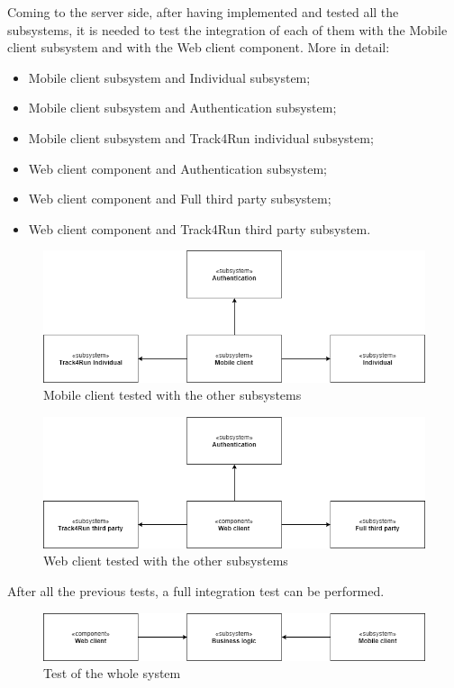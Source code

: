 Coming to the server side, after having implemented and tested all the subsystems, it is needed to test the integration of each of them with the Mobile client subsystem and with the Web client component.
More in detail:
	\begin{itemize}
	\item Mobile client subsystem and Individual subsystem;
	\item Mobile client subsystem and Authentication subsystem;
	\item Mobile client subsystem and Track4Run individual subsystem;
	\item Web client component and Authentication subsystem;
	\item Web client component and Full third party subsystem;
	\item Web client component and Track4Run third party subsystem.
	\end{itemize}
	
	\begin{figure}[H]
	\includegraphics[scale=0.5, center] {images/integration/mobileAndServices.png}
	\caption {Mobile client tested with the other subsystems}
	\end{figure}
	
	\begin{figure}[H]
	\includegraphics[scale=0.5, center] {images/integration/webAndServices.png}
	\caption {Web client tested with the other subsystems}
	\end{figure}
	
	After all the previous tests, a full integration test can be performed.
	
	\begin{figure}[H]
	\includegraphics[scale=0.5, center] {images/integration/general.png}
	\caption {Test of the whole system}
	\end{figure}
	